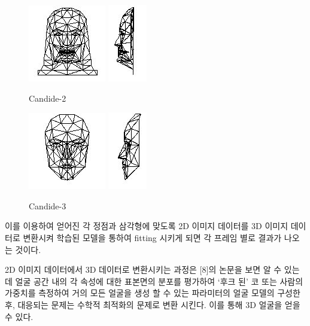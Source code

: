 \documentclass[chapter,oneside]{oblivoir}
\begin{document}
\begin{figure}[h!]
    \centering
    \includegraphics{pic/chp2/img694}
    \includegraphics{pic/chp2/img695}
    \caption{Candide-2}
\end{figure}

\begin{figure}[h!]
    \centering
    \includegraphics{pic/chp2/img696}
    \includegraphics{pic/chp2/img697}
    \caption{Candide-3}
\end{figure}

이를 이용하여 얻어진 각 정점과 삼각형에 맞도록 2D 이미지 데이터를 3D 이미지 데이터로 변환시켜 학습된 모델을 통하여 fitting 시키게 되면 각 프레임 별로 결과가 나오는 것이다.

2D 이미지 데이터에서 3D 데이터로 변환시키는 과정은 [8]의 논문을 보면 알 수 있는데 
얼굴 공간 내의 각 속성에 대한 표본면의 분포를 평가하여 ‘후크 된’ 코 또는 사람의 가중치를 측정하여 거의 모든 얼굴을 생성 할 수 있는 파라미터의 얼굴 모델의 구성한 후, 대응되는 문제는 수학적 최적화의 문제로 변환 시킨다. 이를 통해 3D 얼굴을 얻을 수 있다.
\end{document}
